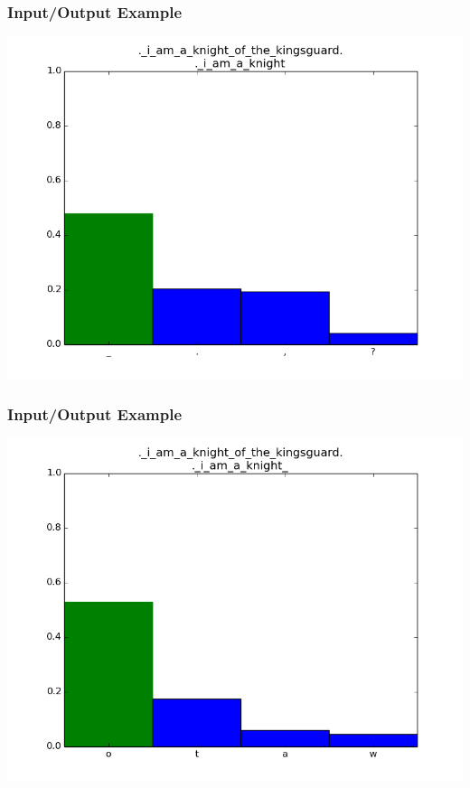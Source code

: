 \documentclass[12]{beamer}
\begin{document}
\begin{frame}
\frametitle{Input/Output Example}
\begin{center}
\includegraphics[scale=0.4]{../distplot/14.png}
\end{center}
\end{frame}

\begin{frame}
\frametitle{Input/Output Example}
\begin{center}
\includegraphics[scale=0.4]{../distplot/15.png}
\end{center}
\end{frame}
\end{document}
